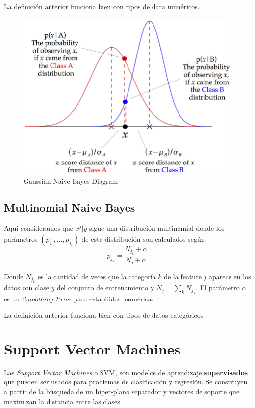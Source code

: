 La definición anterior funciona bien con tipos de data numéricos. 

\begin{figure}[H]
    \center
    \includegraphics[scale=2]{notebooks/ML/img/gaussian_naive_bayes_diagram.png}
    \caption{Gaussian Naive Bayes Diagram}
\end{figure}

\subsection{Multinomial Naive Bayes}

Aquí consideramos que $x^j | y$ sigue una distribución multinomial donde los parámetros $(p_{j_1}, \dots , p_{j_k})$ de esta distribución son calculados según 
$$
p_{j_k} = \frac{N_{j_k} + \alpha}{N_j + \alpha}  
$$

Donde $N_{j_k}$ es la cantidad de veces que la categoría $k$ de la feature $j$ aparece en los datos con clase $y$ del conjunto de entrenamiento y $N_j = \sum_k N_{j_k}$. El parámetro $\alpha$ es un \textit{Smoothing Prior} para estabilidad numérica. 

La definición anterior funciona bien con tipos de datos categóricos. 

\section{Support Vector Machines}

Las \textit{Support Vector Machines} o SVM, son modelos de aprendizaje \textbf{supervisados} que pueden ser usados para problemas de clasificación y regresión. Se construyen a partir de la búsqueda de un hiper-plano separador y vectores de soporte que maximizan la distancia entre las clases. 

